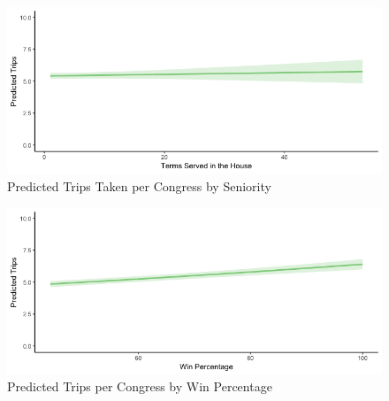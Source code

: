\documentclass[12pt]{article}                           %
\begin{document}

\begin{figure}[hbt]
\centering
\includegraphics[scale=.55]{seniority.png}
  \caption{Predicted Trips Taken per Congress by Seniority}
\end{figure}

\begin{figure}[hbt]
\centering
\includegraphics[scale=.55]{winpct.png}
  \caption{Predicted Trips per Congress by Win Percentage}
\end{figure}
\end{document}
